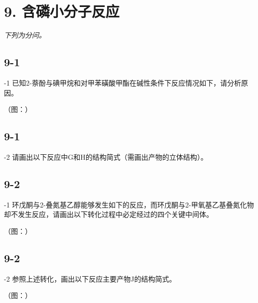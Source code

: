 \section*{9. 含磷小分子反应}
\textit{下列为分问。}

\subsection*{9-1}
-1 已知2-萘酚与碘甲烷和对甲苯磺酸甲酯在碱性条件下反应情况如下，请分析原因。

（图：）

\subsection*{9-1}
-2 请画出以下反应中G和H的结构简式（需画出产物的⽴体结构）。

\subsection*{9-2}
-1 环戊酮与2-叠氮基⼄醇能够发⽣如下的反应，⽽环戊酮与2-甲氧基⼄基叠氮化物却不发⽣反应，请画出以下转化过程中必定经过的四个关键中间体。

（图：）

\subsection*{9-2}
-2 参照上述转化，画出以下反应主要产物J的结构简式。

（图：）
